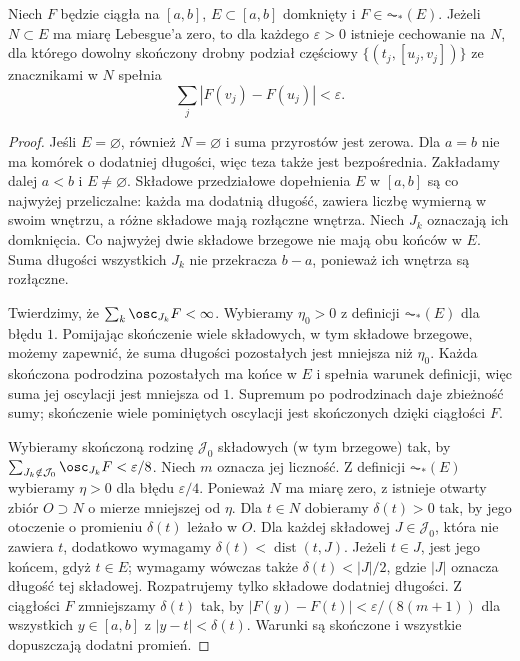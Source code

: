 \begin{lemat}
\label{ma1:kh:lem:acstar-null-variation}\label{it:lem:acstar-null-variation}
Niech $F$ będzie ciągła na $[a,b]$, $E\subset[a,b]$ domknięty i $F\in\AC_*(E)$. Jeżeli $N\subset E$ ma miarę Lebesgue'a zero, to dla każdego $\varepsilon>0$ istnieje cechowanie na $N$, dla którego dowolny skończony drobny podział częściowy $\{(t_j,[u_j,v_j])\}$ ze znacznikami w $N$ spełnia
\[
 \sum_j|F(v_j)-F(u_j)|<\varepsilon.
\]
\end{lemat}
\begin{proof}
Jeśli $E=\varnothing$, również $N=\varnothing$ i suma przyrostów jest zerowa. Dla $a=b$ nie ma komórek o dodatniej długości, więc teza także jest bezpośrednia. Zakładamy dalej $a<b$ i $E\ne\varnothing$. Składowe przedziałowe dopełnienia $E$ w $[a,b]$ są co najwyżej przeliczalne: każda ma dodatnią długość, zawiera liczbę wymierną w swoim wnętrzu, a różne składowe mają rozłączne wnętrza. Niech $J_k$ oznaczają ich domknięcia. Co najwyżej dwie składowe brzegowe nie mają obu końców w $E$. Suma długości wszystkich $J_k$ nie przekracza $b-a$, ponieważ ich wnętrza są rozłączne.

Twierdzimy, że $\sum_k\osc_{J_k}F<\infty$. Wybieramy $\eta_0>0$ z definicji $\AC_*(E)$ dla błędu $1$. Pomijając skończenie wiele składowych, w tym składowe brzegowe, możemy zapewnić, że suma długości pozostałych jest mniejsza niż $\eta_0$. Każda skończona podrodzina pozostałych ma końce w $E$ i spełnia warunek definicji, więc suma jej oscylacji jest mniejsza od $1$. Supremum po podrodzinach daje zbieżność sumy; skończenie wiele pominiętych oscylacji jest skończonych dzięki ciągłości $F$.

Wybieramy skończoną rodzinę $\mathcal J_0$ składowych (w tym brzegowe) tak, by $\sum_{J_k\notin\mathcal J_0}\osc_{J_k}F<\varepsilon/8$. Niech $m$ oznacza jej liczność. Z definicji $\AC_*(E)$ wybieramy $\eta>0$ dla błędu $\varepsilon/4$. Ponieważ $N$ ma miarę zero, z  istnieje otwarty zbiór $O\supset N$ o mierze mniejszej od $\eta$. Dla $t\in N$ dobieramy $\delta(t)>0$ tak, by jego otoczenie o promieniu $\delta(t)$ leżało w $O$. Dla każdej składowej $J\in\mathcal J_0$, która nie zawiera $t$, dodatkowo wymagamy $\delta(t)<\operatorname{dist}(t,J)$. Jeżeli $t\in J$, jest jego końcem, gdyż $t\in E$; wymagamy wówczas także $\delta(t)<|J|/2$, gdzie $|J|$ oznacza długość tej składowej. Rozpatrujemy tylko składowe dodatniej długości. Z ciągłości $F$ zmniejszamy $\delta(t)$ tak, by $|F(y)-F(t)|<\varepsilon/(8(m+1))$ dla wszystkich $y\in[a,b]$ z $|y-t|<\delta(t)$. Warunki są skończone i wszystkie dopuszczają dodatni promień.


\end{proof}
